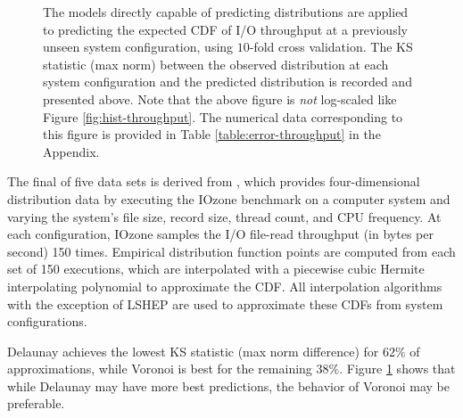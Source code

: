 \documentclass[smallextended,final]{svjour3}  %
\begin{document}
\begin{figure}
  \centering
  \caption{The models directly capable of predicting distributions are
    applied to predicting the expected CDF of I/O throughput at a
    previously unseen system configuration, using $10$-fold cross
    validation. The KS statistic (max norm) between the observed
    distribution at each system configuration and the predicted
    distribution is recorded and presented above. Note that the above
    figure is \textit{not} log-scaled like Figure
    \ref{fig:hist-throughput}. The numerical data corresponding to
    this figure is provided in Table \ref{table:error-throughput} in
    the Appendix.}
  \label{fig:error-throughput}
\end{figure}

The final of five data sets is derived from \cite{cameron2019moana},
which provides four-dimensional distribution data by executing the
IOzone benchmark \cite{iozone} on a computer system and varying the
system's file size, record size, thread count, and CPU frequency. At
each configuration, IOzone samples the I/O file-read throughput (in
bytes per second) 150 times. Empirical distribution function points
are computed from each set of 150 executions, which are interpolated
with a piecewise cubic Hermite interpolating polynomial
\cite{fritsch1980monotone} to approximate the CDF. All interpolation
algorithms with the exception of LSHEP are used to approximate these
CDFs from system configurations.

Delaunay achieves the lowest KS statistic (max norm difference) for
$62\%$ of approximations, while Voronoi is best for the remaining
$38\%$. Figure \ref{fig:error-throughput} shows that while Delaunay
may have more best predictions, the behavior of Voronoi may be
preferable.
\end{document}
